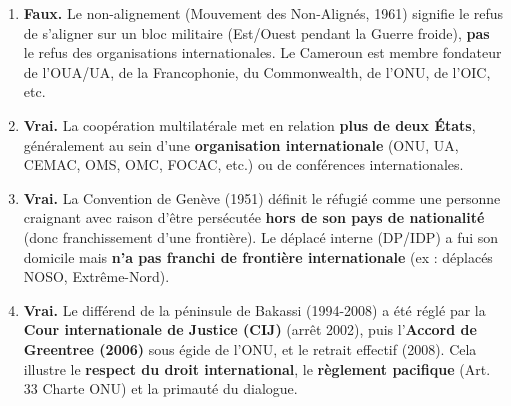 \documentclass[11pt]{article}
\newcommand{\cle}[1]{{\popxbold\color{popdark}#1}}
\begin{document}
\begin{corrige}
\begin{enumerate}
    \item \textbf{Faux.} Le \cle{non-alignement} (Mouvement des Non-Alignés, 1961) signifie le refus de s'aligner sur un bloc militaire (Est/Ouest pendant la Guerre froide), \textbf{pas} le refus des organisations internationales. Le Cameroun est membre fondateur de l'OUA/UA, de la Francophonie, du Commonwealth, de l'ONU, de l'OIC, etc.
    \item \textbf{Vrai.} La \cle{coopération multilatérale} met en relation \textbf{plus de deux États}, généralement au sein d'une \textbf{organisation internationale} (ONU, UA, CEMAC, OMS, OMC, FOCAC, etc.) ou de conférences internationales.
    \item \textbf{Vrai.} La \cle{Convention de Genève (1951)} définit le réfugié comme une personne craignant avec raison d'être persécutée \textbf{hors de son pays de nationalité} (donc franchissement d'une frontière). Le \cle{déplacé interne} (DP/IDP) a fui son domicile mais \textbf{n'a pas franchi de frontière internationale} (ex : déplacés NOSO, Extrême-Nord).
    \item \textbf{Vrai.} Le différend de la \cle{péninsule de Bakassi} (1994-2008) a été réglé par la \textbf{Cour internationale de Justice (CIJ)} (arrêt 2002), puis l'\textbf{Accord de Greentree (2006)} sous égide de l'ONU, et le retrait effectif (2008). Cela illustre le \textbf{respect du droit international}, le \textbf{règlement pacifique} (Art. 33 Charte ONU) et la \cle{primauté du dialogue}.
\end{enumerate}
\end{corrige}
\end{document}
